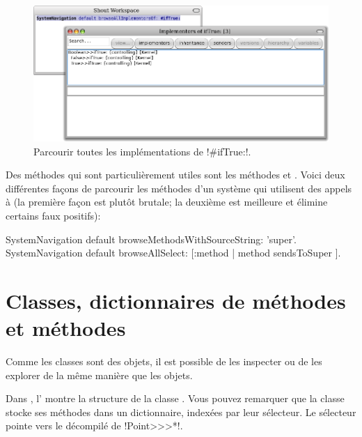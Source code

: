 \documentclass[a4paper,10pt,twoside]{book}
\begin{document}
\begin{figure}[ht]\centering
	\includegraphics[width=\linewidth]{implementors}
	\caption{Parcourir toutes les implémentations de \ct!\#ifTrue:!.}
\end{figure}

Des méthodes qui sont particulièrement utiles sont les méthodes  et . 
Voici deux différentes façons de parcourir les méthodes d'un système qui utilisent des appels à \super (la première façon est plutôt brutale; la deuxième est meilleure et élimine certains faux positifs):
\begin{code}{}
SystemNavigation default browseMethodsWithSourceString: 'super'.
SystemNavigation default browseAllSelect: [:method | method sendsToSuper ].
\end{code}

\section{Classes, dictionnaires de méthodes et méthodes}

Comme les classes sont des objets, il est possible de les inspecter ou de les explorer de la même manière que les objets.


Dans , l' montre la structure de la classe .
Vous pouvez remarquer que la classe stocke ses méthodes dans un dictionnaire, indexées par leur sélecteur.
Le sélecteur \ct{#*} pointe vers le  décompilé de \ct!Point>>>*!.
\end{document}
